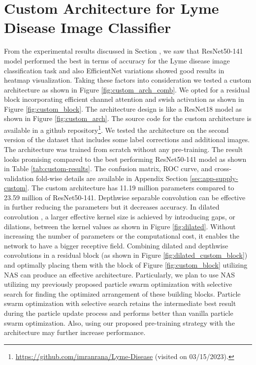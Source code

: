\section{Custom Architecture for Lyme Disease Image Classifier}\label{sec:in_progress_archi}
From the experimental results discussed in Section \label{sec:pretrain-results}, we saw that ResNet50-141 model performed the best in terms of accuracy for the Lyme disease image classification task and also EfficientNet variations showed good results in heatmap visualization. Taking these factors into consideration we tested a custom architecture as shown in Figure \ref{fig:custom_arch_comb}. We opted for a residual block incorporating efficient channel attention \cite{ECARef} and swish activation as shown in Figure \ref{fig:custom_block}. The architecture design is like a ResNet18 model as shown in Figure \ref{fig:custom_arch}. The source code for the custom architecture is available in a github repository\footnote{\url{https://github.com/imranrana/Lyme-Disease} (visited on 03/15/2023).}. We tested the architecture on the second version of the dataset that includes some label corrections and additional images. The architecture was trained from scratch without any pre-training. The result looks promising compared to the best performing ResNet50-141 model as shown in Table \ref{tab:custom-results}.  The confusion matrix, ROC curve, and cross-validation fold-wise details are available in Appendix Section \ref{sec:app-supply-custom}. The custom architecture has 11.19 million parameters compared to 23.59 million of ResNet50-141. Depthwise separable convolution can be effective in further reducing the parameters but it decreases accuracy. In dilated convolution \cite{dilatedConvRef}, a larger effective kernel size is achieved by introducing gaps, or dilations, between the kernel values as shown in Figure \ref{fig:dilated}. Without increasing the number of parameters or the computational cost, it enables the network to have a bigger receptive field. Combining dilated and depthwise convolutions \cite{Sun2020Dilate} in a residual block (as shown in Figure \ref{fig:dilated_custom_block}) and optimally placing them with the block of Figure \ref{fig:custom_block} utilizing NAS \cite{Ren2021} can produce an effective architecture. Particularly, we plan to use NAS utilizing my previously proposed particle swarm optimization with selective search for finding the optimized arrangement of these building blocks. Particle swarm optimization with selective search retains the intermediate best result during the particle update process and performs better than vanilla particle swarm optimization. Also, using our proposed pre-training strategy with the architecture may further increase performance.
